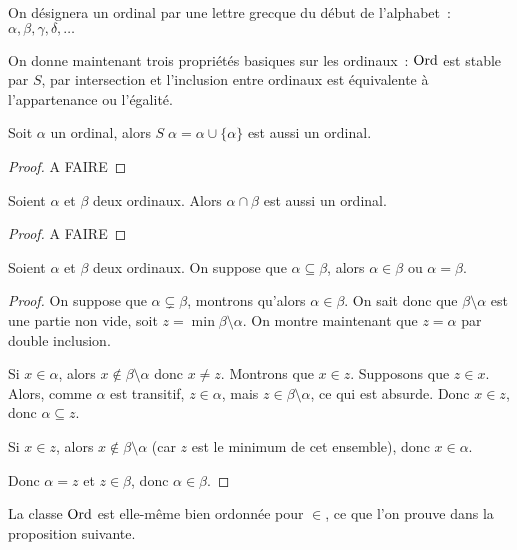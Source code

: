 \begin{notation}
  On désignera un ordinal par une lettre grecque du début de l'alphabet~:
  $\alpha,\beta,\gamma,\delta,\ldots$
\end{notation}

On donne maintenant trois propriétés basiques sur les ordinaux~: $\operatorname{Ord}$ est
stable par $S$, par intersection et l'inclusion entre ordinaux est équivalente
à l'appartenance ou l'égalité.

\begin{proposition}
  Soit $\alpha$ un ordinal, alors $S\;\alpha = \alpha\cup\{\alpha\}$ est
  aussi un ordinal.
\end{proposition}

\begin{proof}
  A FAIRE
\end{proof}

\begin{proposition}
  Soient $\alpha$ et $\beta$ deux ordinaux. Alors $\alpha\cap \beta$ est aussi
  un ordinal.
\end{proposition}

\begin{proof}
  A FAIRE
\end{proof}

\begin{proposition}
  Soient $\alpha$ et $\beta$ deux ordinaux. On suppose que
  $\alpha \subseteq \beta$, alors $\alpha \in \beta$ ou $\alpha = \beta$.
\end{proposition}

\begin{proof}
  On suppose que $\alpha \subsetneq \beta$, montrons qu'alors
  $\alpha \in \beta$. On sait donc que $\beta\setminus\alpha$ est une partie
  non vide, soit $z = \min \beta\setminus\alpha$. On montre maintenant que
  $z = \alpha$ par double inclusion.

  Si $x\in \alpha$, alors $x\notin\beta\setminus\alpha$ donc $x\neq z$. Montrons
  que $x\in z$. Supposons que $z\in x$. Alors, comme $\alpha$ est transitif,
  $z\in \alpha$, mais $z\in\beta\setminus\alpha$, ce qui est absurde. Donc
  $x\in z$, donc $\alpha\subseteq z$.

  Si $x\in z$, alors $x\notin\beta\setminus\alpha$ (car $z$ est le minimum de
  cet ensemble), donc $x\in\alpha$.

  Donc $\alpha = z$ et $z\in \beta$, donc $\alpha \in \beta$.
\end{proof}

La classe $\operatorname{Ord}$ est elle-même bien ordonnée pour $\in$, ce que l'on prouve dans
la proposition suivante.

